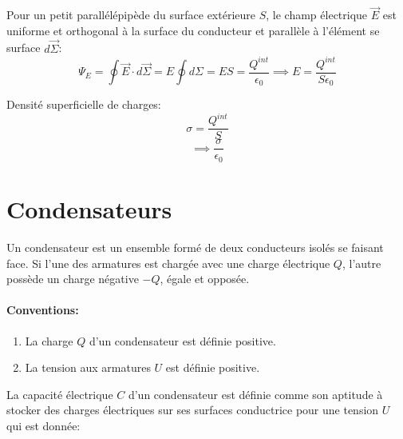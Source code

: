 \documentclass[
    11pt,
    a4paper,
    oneside,
    headinlcude, footinclude,
    twoside,
]{report}
\renewcommand{\vec}[1]{\overrightarrow{#1}}
\begin{document}
\begin{description}
        Pour un petit parallélépipède du surface extérieure $S$, le champ
        électrique $\vec E$ est uniforme et orthogonal à la surface du
        conducteur et parallèle à l'élément se surface $d \vec \Sigma$:
        \begin{equation}
            \label{eq:7.22}
            \Psi_E = \oint \vec E \cdot d\vec \Sigma = E \oint d \Sigma =
            ES = \frac{Q^{int}}{\epsilon_0} \implies E = \frac{Q^{int}}{S
            \epsilon_0}
        \end{equation}

        Densité superficielle de charges: \begin{equation}
            \label{eq:7.23}
            \sigma = \frac{Q^{int}}{S}
        \end{equation}
        \begin{equation}
            \label{eq:7.24}
            \implies \frac{\sigma}{\epsilon_0}
        \end{equation}
\end{description}

\section{Condensateurs}
\label{sub:condensateurs}

Un condensateur est un ensemble formé de deux conducteurs isolés se faisant
face. Si l'une des armatures est chargée avec une charge électrique $Q$,
l'autre possède  un charge négative $-Q$, égale et opposée.

\begin{center}
\end{center}


\paragraph{Conventions:}

\begin{enumerate}
    \item La charge $Q$ d'un condensateur est définie positive.
    \item La tension aux armatures $U$ est définie positive.
\end{enumerate}

La capacité électrique $C$ d'un condensateur est définie comme son aptitude à
stocker des charges électriques sur ses surfaces conductrice pour une tension
$U$ qui est donnée:
\end{document}
